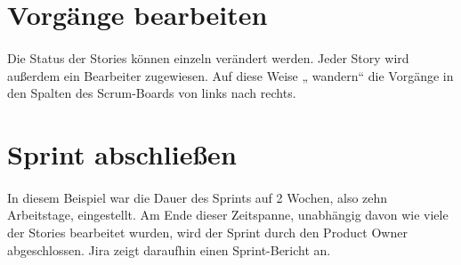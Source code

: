 \documentclass{article}
\begin{document}
\section{Vorgänge bearbeiten}
\paragraph{}
Die Status der Stories können einzeln verändert werden. Jeder Story wird außerdem ein Bearbeiter zugewiesen. Auf diese Weise „ wandern“ die Vorgänge in den Spalten des Scrum-Boards von links nach rechts.

\begin{figure}[h]
  \centering
  \label{}
\end{figure}
\paragraph{}

\section{Sprint abschließen}
\paragraph{}
In diesem Beispiel war die Dauer des Sprints auf 2 Wochen, also zehn Arbeitstage, eingestellt. Am Ende dieser Zeitspanne, unabhängig davon wie viele der Stories bearbeitet wurden, wird der Sprint durch den Product Owner abgeschlossen. Jira zeigt daraufhin einen Sprint-Bericht an.

\begin{figure}[h]
  \centering
  \label{}
\end{figure}
\end{document}

